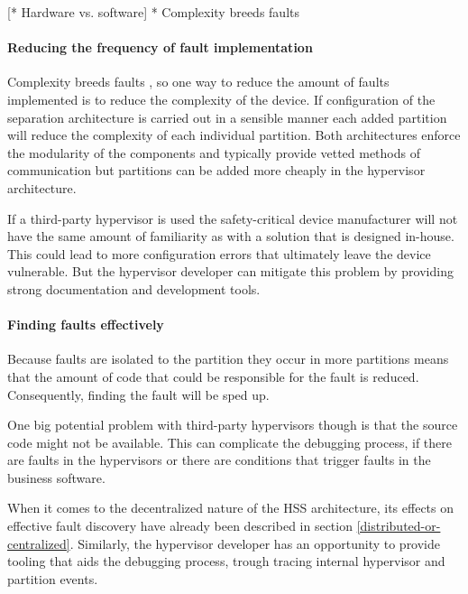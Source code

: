 [* Hardware vs. software]
* Complexity breeds faults

\paragraph{Reducing the frequency of fault implementation}
Complexity breeds faults \cite{nguyen2017impact}, so one way to reduce the amount of faults implemented is to reduce the complexity of the device. If configuration of the separation architecture is carried out in a sensible manner each added partition will reduce the complexity of each individual partition. Both architectures enforce the modularity of the components and typically provide vetted methods of communication but partitions can be added more cheaply in the hypervisor architecture.

If a third-party hypervisor is used the safety-critical device manufacturer will not have the same amount of familiarity as with a solution that is designed in-house. This could lead to more configuration errors that ultimately leave the device vulnerable. But the hypervisor developer can mitigate this problem by providing strong documentation and development tools.

\paragraph{Finding  faults effectively}
Because faults are isolated to the partition they occur in more partitions means that the amount of code that could be responsible for the fault is reduced. Consequently, finding the fault will be sped up.

One big potential problem with third-party hypervisors though is that the source code might not be available. This can complicate the debugging process, if there are faults in the hypervisors or there are conditions that trigger faults in the business software. 

When it comes to the decentralized nature of the \gls{HSS} architecture, its effects on effective fault discovery have already been described in section \ref{distributed-or-centralized}. Similarly, the hypervisor developer has an opportunity to provide tooling that aids the debugging process, trough tracing internal hypervisor and partition events.

